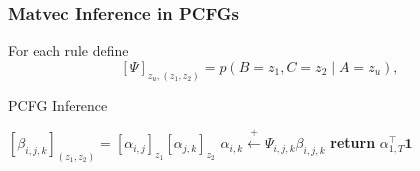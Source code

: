 \documentclass{beamer}
\begin{document}

\begin{frame}
\frametitle{Matvec Inference in PCFGs}

For each rule define
$$[\Psi]_{z_u, (z_1,z_2)} = p(B=z_1,C=z_2 \mid A=z_u),$$

\begin{algorithm}[H]
\caption{PCFG Inference}
\begin{algorithmic} 
\STATE $[\beta_{i,j,k}]_{(z_1,z_2)} = [\alpha_{i,j}]_{z_1}[\alpha_{j,k}]_{z_2}$
\ENDFOR
\STATE $\alpha_{i,k} \stackrel{+}{\gets} \Psi_{i,j,k}\beta_{i,j,k}$
\ENDFOR
\STATE \textbf{return} $\alpha_{1,T}^\top \mathbf{1}$
\end{algorithmic}

\end{algorithm}
\end{frame}
\end{document}
